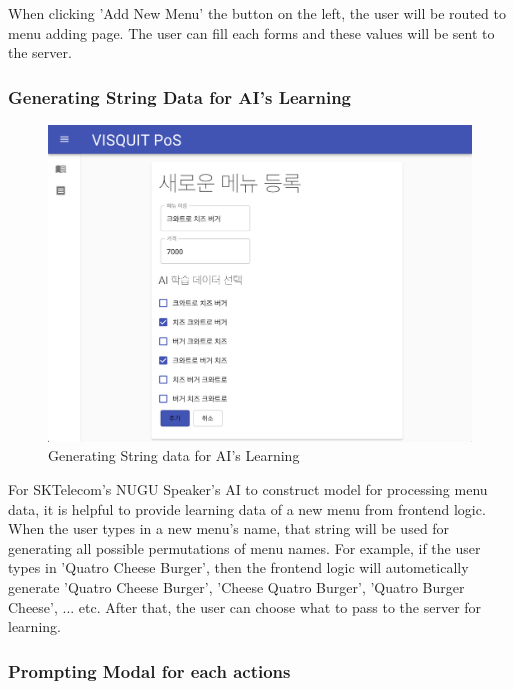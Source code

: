 \documentclass[conference,compsoc]{IEEEtran}
\begin{document}
When clicking 'Add New Menu' the button on the left, the user will be routed to menu adding page. The user can fill each forms and these values will be sent to the server.

\subsubsection{Generating String Data for AI's Learning}

\begin{figure}[h!]
  \includegraphics[width=\linewidth]{figures/frontend/04-newmenu-ai.png}
  \caption{Generating String data for AI's Learning}
  \label{fig:04-newmenu-ai}
\end{figure}

For SKTelecom's NUGU Speaker's AI to construct model for processing menu data, it is helpful to provide learning data of a new menu from frontend logic. When the user types in a new menu's name, that string will be used for generating all possible permutations of menu names. For example, if the user types in 'Quatro Cheese Burger', then the frontend logic will autometically generate 'Quatro Cheese Burger', 'Cheese Quatro Burger', 'Quatro Burger Cheese', ... etc. After that, the user can choose what to pass to the server for learning.

\subsubsection{Prompting Modal for each actions}
\end{document}
